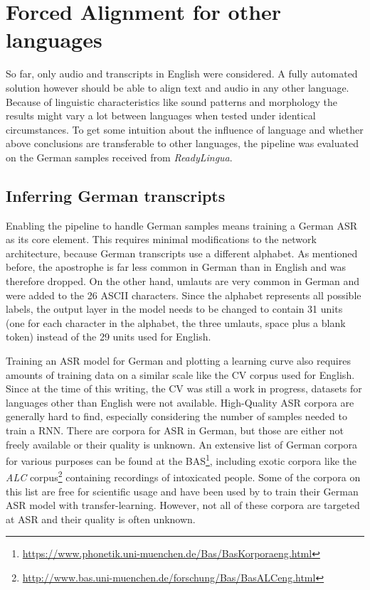 \section{Forced Alignment for other languages}

So far, only audio and transcripts in English were considered. A fully automated solution however should be able to align text and audio in any other language. Because of linguistic characteristics like sound patterns and morphology the results might vary a lot between languages when tested under identical circumstances. To get some intuition about the influence of language and whether above conclusions are transferable to other languages, the pipeline was evaluated on the German samples received from \textit{ReadyLingua}.

\subsection{Inferring German transcripts}

Enabling the pipeline to handle German samples means training a German \ac{ASR} as its core element. This requires minimal modifications to the network architecture, because German transcripts use a different alphabet. As mentioned before, the apostrophe is far less common in German than in English and was therefore dropped. On the other hand, umlauts are very common in German and were added to the 26 ASCII characters. Since the alphabet represents all possible labels, the output layer in the model needs to be changed to contain 31 units (one for each character in the alphabet, the three umlauts, space plus a blank token) instead of the 29 units used for English.

Training an \ac{ASR} model for German and plotting a learning curve also requires amounts of training data on a similar scale like the \ac{CV} corpus used for English. Since at the time of this writing, the \ac{CV} was still a work in progress, datasets for languages other than English were not available. High-Quality \ac{ASR} corpora are generally hard to find, especially considering the number of samples needed to train a \ac{RNN}. There are corpora for \ac{ASR} in German, but those are either not freely available or their quality is unknown. An extensive list of German corpora for various purposes can be found at the \ac{BAS}\footnote{\url{https://www.phonetik.uni-muenchen.de/Bas/BasKorporaeng.html}}, including exotic corpora like the \textit{ALC} corpus\footnote{\url{http://www.bas.uni-muenchen.de/forschung/Bas/BasALCeng.html}} containing recordings of intoxicated people. Some of the corpora on this list are free for scientific usage and have been used by \cite{budget} to train their German \ac{ASR} model with transfer-learning. However, not all of these corpora are targeted at \ac{ASR} and their quality is often unknown.

